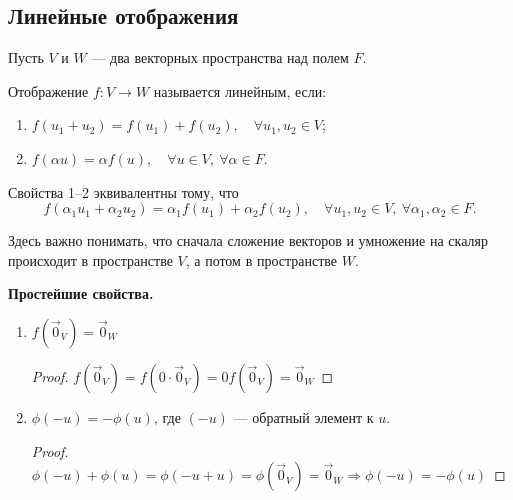 \subsection{Линейные отображения}

Пусть $V$ и $W$ --- два векторных пространства над полем $F$.

\begin{Def}
Отображение $f : V \rightarrow W$ называется линейным, если:
\begin{enumerate}
\item $f(u_1 + u_2) = f(u_1) + f(u_2), \quad \forall u_1, u_2 \in V$;
\item $f(\alpha u) = \alpha f(u), \quad \forall u \in V,\ \forall \alpha \in F$.
\end{enumerate}
\end{Def}

\begin{Comment}
Свойства 1--2 эквивалентны тому, что 
\[
f(\alpha_1 u_1 + \alpha_2 u_2) = \alpha_1f(u_1) + \alpha_2f(u_2), \quad \forall u_1, u_2 \in V,\ \forall \alpha_1, \alpha_2 \in F.
\]
\end{Comment}
Здесь важно понимать, что сначала сложение векторов и умножение на скаляр происходит в пространстве $V$, а потом в пространстве $W$.

\vspace{0.3cm}
\textbf{Простейшие свойства.}
\begin{enumerate}
\item $f(\vec{0}_V) = \vec{0}_W$
\begin{proof}
$f(\vec{0}_V) = f(0 \cdot \vec{0}_V) = 0f(\vec{0}_V) = \vec{0}_W$
\end{proof}
\item $\phi(-u) = -\phi(u)$, где $(-u)$ --- обратный элемент к $u$.
\begin{proof}
$\phi(-u) + \phi(u) = \phi(-u+u) = \phi(\vec{0}_V) = \vec{0}_W \Rightarrow \phi(-u) = -\phi(u)$
\end{proof}
\end{enumerate}

